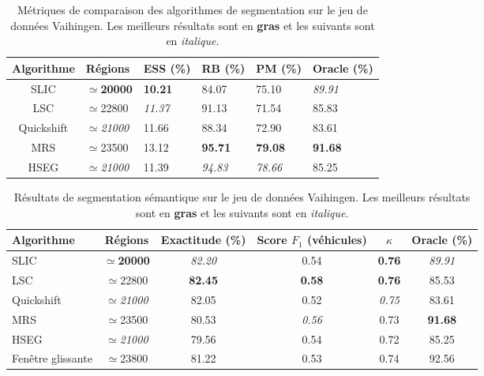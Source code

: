\begin{table}
  \centering
  \setlength{\tabcolsep}{10pt}
  \begin{tabularx}{\textwidth}{ c Y Y Y Y Y }
  \toprule
  Algorithme & Régions & ESS (\%) & RB (\%) & PM (\%) & Oracle (\%)\\
  \midrule
  \gls{SLIC} & $\simeq$\textbf{\num{20000}} & \textbf{\num{10.21}} & \num{84.07} & \num{75.10} & \textit{\num{89.91}}\\
  \gls{LSC} & $\simeq$\num{22800} & \textit{\num{11.37}} & \num{91.13} & \num{71.54} & \num{85.83}\\
  Quickshift & $\simeq$\textit{\num{21000}} & \num{11.66} & \num{88.34} & \num{72.90} & \num{83.61}\\
  \midrule
  \gls{MRS} & $\simeq$\num{23500} & \num{13.12} & \textbf{\num{95.71}} & \textbf{\num{79.08}} & \textbf{\num{91.68}}\\
  \gls{HSEG} & $\simeq$\textit{\num{21000}} & \num{11.39} & \textit{\num{94.83}} & \textit{\num{78.66}} & \num{85.25}\\
  \bottomrule
  \end{tabularx}
  \caption[Métriques de comparaison des algorithmes de segmentation sur le jeu de données  Vaihingen.]{Métriques de comparaison des algorithmes de segmentation sur le jeu de données  Vaihingen. Les meilleurs résultats sont en \textbf{gras} et les suivants sont en \emph{italique}.}
  \label{table:segmentation_metrics}
\end{table}

\begin{table}
  \begin{tabularx}{\textwidth}{ Y c c c c c }
  \toprule
  Algorithme & Régions & Exactitude (\%) & Score $F_1$ (véhicules) & $\kappa$ & Oracle (\%)\\
	\midrule
  \gls{SLIC} & $\simeq$\textbf{\num{20000}} & \textit{\num{82.20}} & \num{0.54} & \textbf{\num{0.76}} & \textit{\num{89.91}}\\
  \gls{LSC} & $\simeq$\num{22800} & \textbf{\num{82.45}} & \textbf{\num{0.58}} & \textbf{\num{0.76}} & \num{85.53}\\
  Quickshift & $\simeq$\textit{\num{21000}} & \num{82.05} & \num{0.52} & \textit{\num{0.75}} & \num{83.61}\\
  \midrule
  \gls{MRS} & $\simeq$\num{23500} & \num{80.53} & \textit{\num{0.56}} & \num{0.73} & \textbf{\num{91.68}}\\
  \gls{HSEG} & $\simeq$\textit{\num{21000}} & \num{79.56} & \num{0.54} & \num{0.72} & \num{85.25}\\
  \midrule
  Fenêtre glissante & $\simeq$\num{23800} & \num{81.22} & \num{0.53} & \num{0.74} & \num{92.56}\\
  \bottomrule
  \end{tabularx}
  \caption[Résultats de segmentation sémantique sur le jeu de données  Vaihingen.]{Résultats de segmentation sémantique sur le jeu de données  Vaihingen. Les meilleurs résultats sont en \textbf{gras} et les suivants sont en \emph{italique}.}
  \label{table:classification_metrics}
\end{table}

